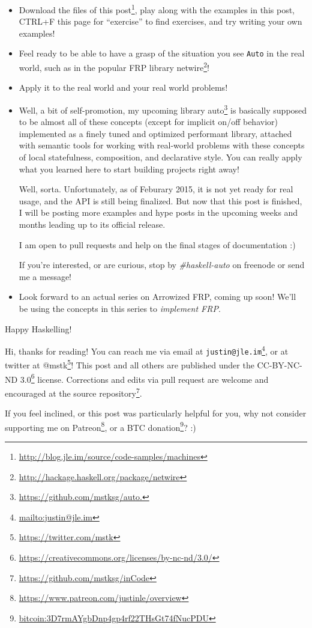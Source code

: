 \documentclass[]{article}
\renewcommand{\href}[2]{#2\footnote{\url{#1}}}
\begin{document}
\begin{itemize}
\item
  \href{http://blog.jle.im/source/code-samples/machines}{Download the files of
  this post}, play along with the examples in this post, CTRL+F this page for
  ``exercise'' to find exercises, and try writing your own examples!
\item
  Feel ready to be able to have a grasp of the situation you see \texttt{Auto}
  in the real world, such as in the popular FRP library
  \href{http://hackage.haskell.org/package/netwire}{netwire}!
\item
  Apply it to the real world and your real world problems!
\item
  Well, a bit of self-promotion, my upcoming library
  \href{https://github.com/mstksg/auto.}{auto} is basically supposed to be
  almost all of these concepts (except for implicit on/off behavior) implemented
  as a finely tuned and optimized performant library, attached with semantic
  tools for working with real-world problems with these concepts of local
  statefulness, composition, and declarative style. You can really apply what
  you learned here to start building projects right away!

  Well, sorta. Unfortunately, as of Feburary 2015, it is not yet ready for real
  usage, and the API is still being finalized. But now that this post is
  finished, I will be posting more examples and hype posts in the upcoming weeks
  and months leading up to its official release.

  I am open to pull requests and help on the final stages of documentation :)

  If you're interested, or are curious, stop by \emph{\#haskell-auto} on
  freenode or send me a message!
\item
  Look forward to an actual series on Arrowized FRP, coming up soon! We'll be
  using the concepts in this series to \emph{implement FRP}.
\end{itemize}

Happy Haskelling!

Hi, thanks for reading! You can reach me via email at
\href{mailto:justin@jle.im}{\nolinkurl{justin@jle.im}}, or at twitter at
\href{https://twitter.com/mstk}{@mstk}! This post and all others are published
under the \href{https://creativecommons.org/licenses/by-nc-nd/3.0/}{CC-BY-NC-ND
3.0} license. Corrections and edits via pull request are welcome and encouraged
at \href{https://github.com/mstksg/inCode}{the source repository}.

If you feel inclined, or this post was particularly helpful for you, why not
consider \href{https://www.patreon.com/justinle/overview}{supporting me on
Patreon}, or a \href{bitcoin:3D7rmAYgbDnp4gp4rf22THsGt74fNucPDU}{BTC donation}?
:)
\end{document}
